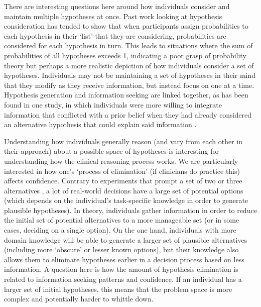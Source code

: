 \documentclass[a4paper, nobind]{templates/ociamthesis}
\begin{document}
\hfill\break
There are interesting questions here around how individuals consider and maintain multiple hypotheses at once. Past work looking at hypothesis consideration \autocite{robinson_revision_1985,van_wallendael_tracing_1990} has tended to show that when participants assign probabilities to each hypothesis in their `list' that they are considering, probabilities are considered for each hypothesis in turn. This leads to situations where the sum of probabilities of all hypotheses exceeds 1, indicating a poor grasp of probability theory but perhaps a more realistic depiction of how individuals consider a set of hypotheses. Individuals may not be maintaining a set of hypotheses in their mind that they modify as they receive information, but instead focus on one at a time. Hypothesis generation and information seeking are linked together, as has been found in one study, in which individuals were more willing to integrate information that conflicted with a prior belief when they had already considered an alternative hypothesis that could explain said information \autocite{vallee-tourangeau_role_2000}.

\hfill\break
Understanding how individuals generally reason (and vary from each other in their approach) about a possible space of hypotheses is interesting for understanding how the clinical reasoning process works. We are particularly interested in how one's `process of elimination' (if clinicians do practice this) affects confidence. Contrary to experiments that prompt a set of two or three alternatives \autocite{meyer_physicians_2013,chartan_isolating_2019,kuper_mitigating_2024}, a lot of real-world decisions have a large set of potential options (which depends on the individual's task-specific knowledge in order to generate plausible hypotheses). In theory, individuals gather information in order to reduce the initial set of potential alternatives to a more manageable set (or in some cases, deciding on a single option). On the one hand, individuals with more domain knowledge will be able to generate a larger set of plausible alternatives (including more `obscure' or lesser known options), but their knowledge also allows them to eliminate hypotheses earlier in a decision process based on less information. A question here is how the amount of hypothesis elimination is related to information seeking patterns and confidence. If an individual has a larger set of initial hypotheses, this means that the problem space is more complex and potentially harder to whittle down.
\end{document}
